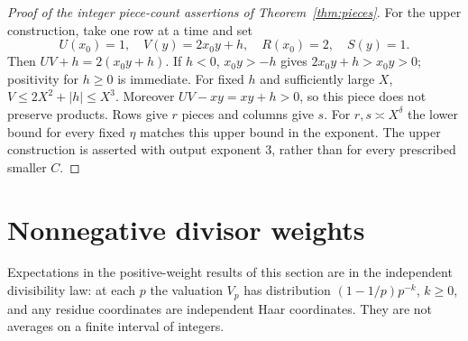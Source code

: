 \documentclass[11pt]{article}
\theoremstyle{definition}
\theoremstyle{remark}
\numberwithin{equation}{section}
\begin{document}
\begin{proof}[Proof of the integer piece-count assertions of Theorem~\ref{thm:pieces}]
For the upper construction, take one row at a time and set
\begin{equation}\label{eq:c-row-construction}
 U(x_0)=1,\quad V(y)=2x_0y+h,\quad R(x_0)=2,\quad S(y)=1.
\end{equation}
Then $UV+h=2(x_0y+h)$. If $h<0$, $x_0y>-h$ gives $2x_0y+h>x_0y>0$; positivity for $h\ge0$
is immediate. For fixed $h$ and sufficiently large $X$, $V\le2X^2+|h|\le X^3$.
Moreover $UV-xy=xy+h>0$, so this piece does not preserve products. Rows give $r$ pieces and columns
 give $s$. For $r,s\asymp X^\delta$ the lower bound for every fixed $\eta$ matches this upper bound
in the exponent. The upper construction is asserted with output exponent $3$, rather than for every
prescribed smaller $C$.
\end{proof}

\section{Nonnegative divisor weights}\label{sec:weights}
Expectations in the positive-weight results of this section are in the independent divisibility law:
at each $p$ the valuation $V_p$ has distribution $(1-1/p)p^{-k}$, $k\ge0$, and any residue coordinates
are independent Haar coordinates. They are not averages on a finite interval of integers.
\end{document}
